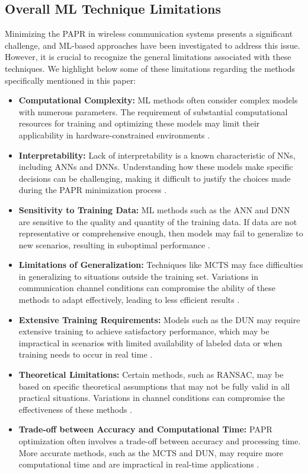 \documentclass[conference]{IEEEtran}
\begin{document}
\subsection{Overall ML Technique Limitations}
Minimizing the PAPR in wireless communication systems presents a significant challenge, and ML-based approaches have been investigated to address this issue. However, it is crucial to recognize the general limitations associated with these techniques. We highlight below some of these limitations regarding the methods specifically mentioned in this paper:
\begin{itemize}
    \item \textbf{Computational Complexity:} ML methods often consider complex models with numerous parameters. The requirement of substantial computational resources for training and optimizing these models may limit their applicability in hardware-constrained environments \cite{b35}.
    \item \textbf{Interpretability:} Lack of interpretability is a known characteristic of NNs, including ANNs and DNNs. Understanding how these models make specific decisions can be challenging, making it difficult to justify the choices made during the PAPR minimization process \cite{b162}.
    \item \textbf{Sensitivity to Training Data:} ML methods such as the ANN and DNN are sensitive to the quality and quantity of the training data. If data are not representative or comprehensive enough, then models may fail to generalize to new scenarios, resulting in suboptimal performance \cite{b39}.
    \item \textbf{Limitations of Generalization:} Techniques like MCTS may face difficulties in generalizing to situations outside the training set. Variations in communication channel conditions can compromise the ability of these methods to adapt effectively, leading to less efficient results \cite{b163}.
    \item \textbf{Extensive Training Requirements:} Models such as the DUN may require extensive training to achieve satisfactory performance, which may be impractical in scenarios with limited availability of labeled data or when training needs to occur in real time \cite{b164}.
    \item \textbf{Theoretical Limitations:} Certain methods, such as RANSAC, may be based on specific theoretical assumptions that may not be fully valid in all practical situations. Variations in channel conditions can compromise the effectiveness of these methods \cite{b134}.
    \item \textbf{Trade-off between Accuracy and Computational Time:} PAPR optimization often involves a trade-off between accuracy and processing time. More accurate methods, such as the MCTS and DUN, may require more computational time and are impractical in real-time applications \cite{b165}.
\end{itemize}
\end{document}
